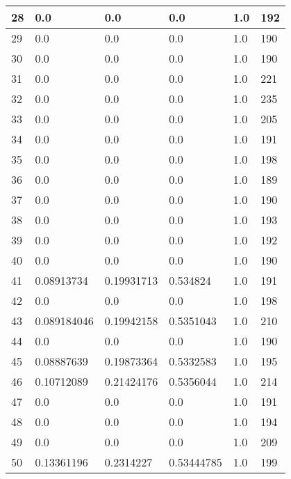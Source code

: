 \begin{longtable}{|l|l|l|l|l|l|}
28 & 0.0 & 0.0 & 0.0 & 1.0 & 192 \\ \hline 
29 & 0.0 & 0.0 & 0.0 & 1.0 & 190 \\ \hline 
30 & 0.0 & 0.0 & 0.0 & 1.0 & 190 \\ \hline 
31 & 0.0 & 0.0 & 0.0 & 1.0 & 221 \\ \hline 
32 & 0.0 & 0.0 & 0.0 & 1.0 & 235 \\ \hline 
33 & 0.0 & 0.0 & 0.0 & 1.0 & 205 \\ \hline 
34 & 0.0 & 0.0 & 0.0 & 1.0 & 191 \\ \hline 
35 & 0.0 & 0.0 & 0.0 & 1.0 & 198 \\ \hline 
36 & 0.0 & 0.0 & 0.0 & 1.0 & 189 \\ \hline 
37 & 0.0 & 0.0 & 0.0 & 1.0 & 190 \\ \hline 
38 & 0.0 & 0.0 & 0.0 & 1.0 & 193 \\ \hline 
39 & 0.0 & 0.0 & 0.0 & 1.0 & 192 \\ \hline 
40 & 0.0 & 0.0 & 0.0 & 1.0 & 190 \\ \hline 
41 & 0.08913734 & 0.19931713 & 0.534824 & 1.0 & 191 \\ \hline 
42 & 0.0 & 0.0 & 0.0 & 1.0 & 198 \\ \hline 
43 & 0.089184046 & 0.19942158 & 0.5351043 & 1.0 & 210 \\ \hline 
44 & 0.0 & 0.0 & 0.0 & 1.0 & 190 \\ \hline 
45 & 0.08887639 & 0.19873364 & 0.5332583 & 1.0 & 195 \\ \hline 
46 & 0.10712089 & 0.21424176 & 0.5356044 & 1.0 & 214 \\ \hline 
47 & 0.0 & 0.0 & 0.0 & 1.0 & 191 \\ \hline 
48 & 0.0 & 0.0 & 0.0 & 1.0 & 194 \\ \hline 
49 & 0.0 & 0.0 & 0.0 & 1.0 & 209 \\ \hline 
50 & 0.13361196 & 0.2314227 & 0.53444785 & 1.0 & 199 \\ \hline 
\end{longtable}
